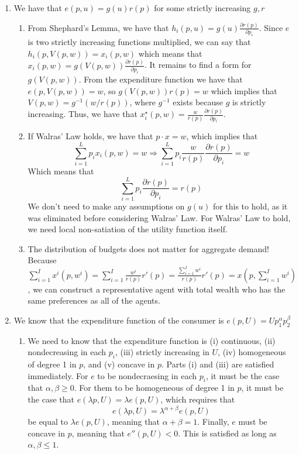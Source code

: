 \documentclass[12pt]{article}
\begin{document}
\begin{enumerate}
	\item We have that $e(p,u) = g(u)r(p)$ for some strictly increasing $g,r$
	\begin{enumerate}
		\item From Shephard's Lemma, we have that $h_i(p,u) = g(u) \frac{\partial r(p)}{\partial p_i}$. Since $e$ is two strictly increasing functions multiplied, we can say that $h_i(p,V(p,w)) = x_i(p,w)$ which means that $x_i(p,w) = g(V(p,w)) \frac{\partial r(p)}{\partial p_i}$. It remains to find a form for $g(V(p,w))$. From the expenditure function we have that $e(p,V(p,w)) = w$, so $g(V(p,w)) r(p) = w$ which implies that $V(p,w) = g^{-1}(w / r(p))$, where $g^{-1}$ exists because $g$ is strictly increasing. Thus, we have that $x^\star_i(p,w) = \frac{w}{r(p)} \frac{\partial r(p)}{\partial p_i}$.
		
		\item If Walras' Law holds, we have that $p\cdot x = w$, which implies that
		\[
		\sum_{i=1}^L p_i x_i(p,w) = w \Longrightarrow \sum_{i=1}^L p_i \frac{w}{r(p)}  \frac{\partial r(p)}{\partial p_i} = w 
		\]
		Which means that
		\[
		\sum_{i=1}^L p_i \frac{\partial r(p)}{\partial p_i} = r(p)
		\]
		We don't need to make any assumptions on $g(u)$ for this to hold, as it was eliminated before considering Walras' Law. For Walras' Law to hold, we need local non-satiation of the utility function itself.
		
		\item The distribution of budgets does not matter for aggregate demand! Because $\sum_{i=1}^I x^i(p,w^i) = \sum_{i=1}^I \frac{w^i}{r(p)} r'(p) = \frac{\sum_{i=1}^I w^i}{r(p)	} r'(p) = x(p,\sum_{i=1}^I w^i)$, we can construct a representative agent with total wealth who has the same preferences as all of the agents.
		\end{enumerate}
	
	\item We know that the expenditure function of the consumer is $e(p,U) = Up_1^\alpha p_2^\beta$
	\begin{enumerate}
		\item We need to know that the expenditure function is (i) continuous, (ii) nondecreasing in each $p_i$, (iii) strictly increasing in $U$, (iv) homogeneous of degree 1 in $p$, and (v) concave in $p$. Parts (i) and (iii) are satisfied immediately. For $e$ to be nondecraesing in each $p_i$, it must be the case that $\alpha, \beta \ge 0$. For them to be homogeneous of degree 1 in $p$, it must be the case that $e(\lambda p, U) = \lambda e(p,U)$, which requires that
		\[
		e(\lambda p , U) = \lambda^{\alpha + \beta} e(p,U)
		\]
		be equal to $\lambda e(p,U)$, meaning that $\alpha + \beta = 1$. Finally, $e$ must be concave in $p$, meaning that $e''(p,U) < 0$. This is satisfied as long as $\alpha, \beta \le 1$. 
		

\end{enumerate}
\end{enumerate}
\end{document}
